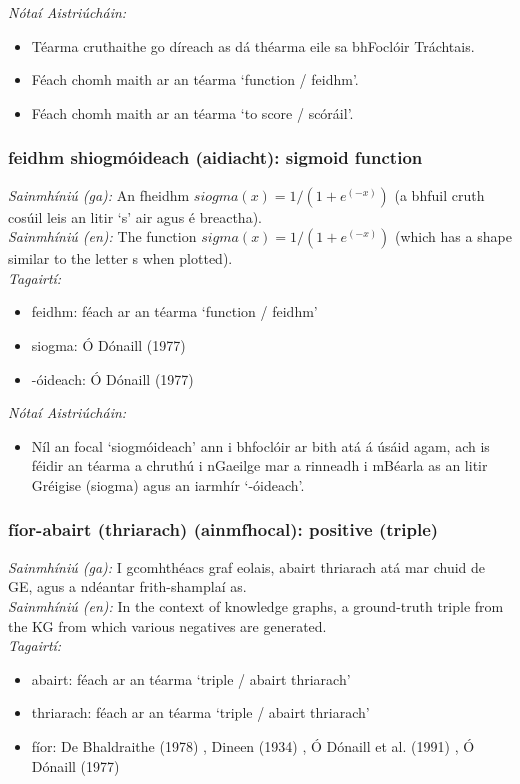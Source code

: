 \documentclass{article}
\begin{document}
 \noindent \textit{Nótaí Aistriúcháin:}
\begin{itemize}
	\item Téarma cruthaithe go díreach as dá théarma eile sa bhFoclóir Tráchtais.
	\item Féach chomh maith ar an téarma `function / feidhm'.
	\item Féach chomh maith ar an téarma `to score / scóráil'.
\end{itemize}


\subsubsection*{feidhm shiogmóideach (aidiacht): sigmoid function}
 \noindent \textit{Sainmhíniú (ga):} An fheidhm $siogma(x) = 1 / (1 + e^(-x))$ (a bhfuil cruth cosúil leis an litir `s' air agus é breactha).
\\
 \noindent \textit{Sainmhíniú (en):} The function $sigma(x) = 1 / (1 + e^(-x))$ (which has a shape similar to the letter s when plotted).
\\
 \noindent \textit{Tagairtí:}
\begin{itemize}
	\item feidhm: féach ar an téarma `function / feidhm'
	\item siogma: Ó Dónaill (1977) \cite{odonaill}
	\item -óideach: Ó Dónaill (1977) \cite{odonaill}
\end{itemize}

 \noindent \textit{Nótaí Aistriúcháin:}
\begin{itemize}
	\item Níl an focal `siogmóideach' ann i bhfoclóir ar bith atá á úsáid agam, ach is féidir an téarma a chruthú i nGaeilge mar a rinneadh i mBéarla as an litir Gréigise (siogma) agus an iarmhír `-óideach'.
\end{itemize}


\subsubsection*{fíor-abairt (thriarach) (ainmfhocal): positive (triple)}
 \noindent \textit{Sainmhíniú (ga):} I gcomhthéacs graf eolais, abairt thriarach atá mar chuid de GE, agus a ndéantar frith-shamplaí as.
\\
 \noindent \textit{Sainmhíniú (en):} In the context of knowledge graphs, a ground-truth triple from the KG from which various negatives are generated.
\\
 \noindent \textit{Tagairtí:}
\begin{itemize}
	\item abairt: féach ar an téarma `triple / abairt thriarach'
	\item thriarach: féach ar an téarma `triple / abairt thriarach'
	\item fíor: De Bhaldraithe (1978) \cite{de-bhaldraithe}, Dineen (1934) \cite{dineen}, Ó Dónaill et al. (1991) \cite{focloir-beag}, Ó Dónaill (1977) \cite{odonaill}
\end{itemize}
\end{document}
